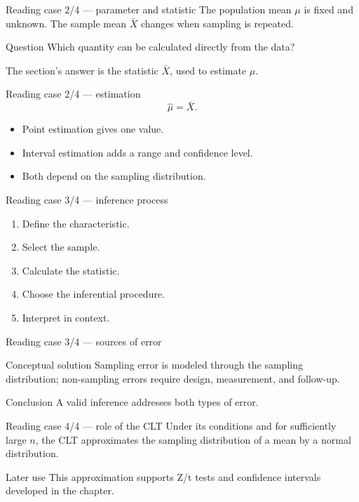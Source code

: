 \documentclass[10pt,aspectratio=169]{beamer}
\begin{document}
\begin{frame}{Reading case 2/4 --- parameter and statistic}
  \footnotesize
  The population mean $\mu$ is fixed and unknown. The sample mean $\bar X$
  changes when sampling is repeated.
  \begin{block}{Question}
    Which quantity can be calculated directly from the data?
  \end{block}
  The section's answer is the statistic $\bar X$, used to estimate $\mu$.
\end{frame}

\begin{frame}{Reading case 2/4 --- estimation}
  \footnotesize
  \[
    \widehat{\mu}=\bar X.
  \]
  \begin{itemize}\itemsep=0.12cm
    \item Point estimation gives one value.
    \item Interval estimation adds a range and confidence level.
    \item Both depend on the sampling distribution.
  \end{itemize}
\end{frame}

\begin{frame}{Reading case 3/4 --- inference process}
  \footnotesize
  \begin{enumerate}\itemsep=0.13cm
    \item Define the characteristic.
    \item Select the sample.
    \item Calculate the statistic.
    \item Choose the inferential procedure.
    \item Interpret in context.
  \end{enumerate}
\end{frame}

\begin{frame}{Reading case 3/4 --- sources of error}
  \footnotesize
  \begin{block}{Conceptual solution}
    Sampling error is modeled through the sampling distribution; non-sampling
    errors require design, measurement, and follow-up.
  \end{block}
  \begin{alertblock}{Conclusion}
    A valid inference addresses both types of error.
  \end{alertblock}
\end{frame}

\begin{frame}{Reading case 4/4 --- role of the CLT}
  \footnotesize
  Under its conditions and for sufficiently large $n$, the CLT approximates the
  sampling distribution of a mean by a normal distribution.
  \begin{block}{Later use}
    This approximation supports Z/t tests and confidence intervals developed in
    the chapter.
  \end{block}
\end{frame}
\end{document}
